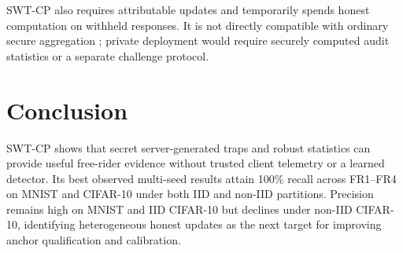 \documentclass[conference]{IEEEtran}
\begin{document}
SWT-CP also requires attributable updates and temporarily spends honest computation on withheld responses. It is not directly compatible with ordinary secure aggregation \cite{bonawitz2017practical}; private deployment would require securely computed audit statistics or a separate challenge protocol.

\section{Conclusion}
SWT-CP shows that secret server-generated traps and robust statistics can provide useful free-rider evidence without trusted client telemetry or a learned detector. Its best observed multi-seed results attain 100\% recall across FR1--FR4 on MNIST and CIFAR-10 under both IID and non-IID partitions. Precision remains high on MNIST and IID CIFAR-10 but declines under non-IID CIFAR-10, identifying heterogeneous honest updates as the next target for improving anchor qualification and calibration.



\end{document}
